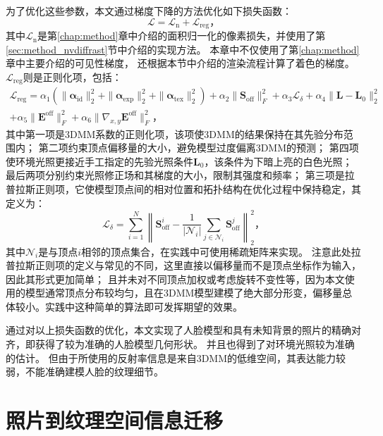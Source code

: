 为了优化这些参数，本文通过梯度下降的方法优化如下损失函数：
\begin{equation}
    \mathcal{L} = \mathcal{L}_\mathrm{n} + \mathcal{L}_\mathrm{reg}
    \text{，}
\end{equation}
其中$\mathcal{L}_\mathrm{n}$是第\ref{chap:method}章中介绍的面积归一化的像素损失，并使用了第\ref{sec:method_nvdiffrast}节中介绍的实现方法。
本章中不仅使用了第\ref{chap:method}章中主要介绍的可见性梯度，
还根据本节中介绍的渲染流程计算了着色的梯度。
$\mathcal{L}_\mathrm{reg}$则是正则化项，包括：
\begin{equation}
\begin{split}
\mathcal{L}_\mathrm{reg} = \alpha_1\left(\| \mathbf{\alpha}_\mathrm{id} \|_2^2 +
    \| \mathbf{\alpha}_\mathrm{exp} \|_2^2 +
    \| \mathbf{\alpha}_\mathrm{tex} \|_2^2\right) +
    \alpha_2 \| \mathbf{S}_\mathrm{off} \|_F^2 +
    \alpha_3 \mathcal{L}_\delta +
    \alpha_4 \| \mathbf{L}-\mathbf{L}_0 \|_2^2 \\
    + \alpha_5 \| \mathbf{E}^\mathrm{off} \|_F^2 +
    \alpha_6 \| \nabla_{x,y} \mathbf{E}^\mathrm{off} \|_F^2
    \text{，}
\end{split}
\end{equation}
其中第一项是3DMM系数的正则化项，该项使3DMM的结果保持在其先验分布范围内；
第二项约束顶点偏移量的大小，避免模型过度偏离3DMM的预测；
第四项使环境光照更接近手工指定的先验光照条件$\mathbf{L}_0$，该条件为下暗上亮的白色光照；
最后两项分别约束光照修正场和其梯度的大小，限制其强度和频率；
第三项是拉普拉斯正则项，它使模型顶点间的相对位置和拓扑结构在优化过程中保持稳定，其定义为：
\begin{equation}
    \mathcal{L}_\delta = \sum_{i=1}^N \left\|\mathbf{S}_\mathrm{off}^i - \frac{1}{|\mathcal{N}_i|}\sum_{j\in\mathcal{N}_i} \mathbf{S}_\mathrm{off}^j\right\|_2^2
    \text{，}
\end{equation}
其中$\mathcal{N}_i$是与顶点$i$相邻的顶点集合，在实践中可使用稀疏矩阵来实现。
注意此处拉普拉斯正则项的定义与常见的不同，这里直接以偏移量而不是顶点坐标作为输入，因此其形式更加简单；
且并未对不同顶点加权或考虑旋转不变性等，因为本文使用的模型通常顶点分布较均匀，且在3DMM模型建模了绝大部分形变，偏移量总体较小。实践中这种简单的算法即可发挥期望的效果。

通过对以上损失函数的优化，本文实现了人脸模型和具有未知背景的照片的精确对齐，即获得了较为准确的人脸模型几何形状。
并且也得到了对环境光照较为准确的估计。
但由于所使用的反射率信息是来自3DMM的低维空间，其表达能力较弱，不能准确建模人脸的纹理细节。

\section{照片到纹理空间信息迁移}
\label{sec:method_photo2tex}

